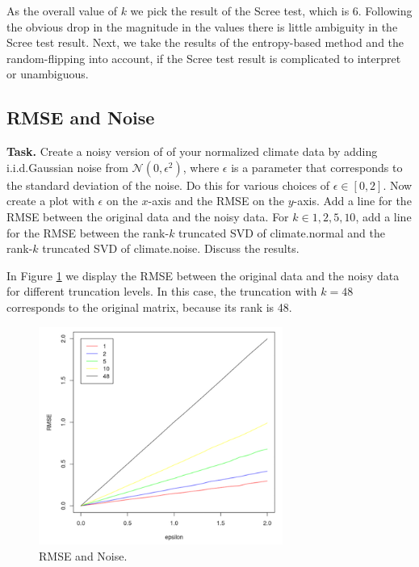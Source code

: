 \documentclass{support/acm_proc_article-sp}
\begin{document}
    As the overall value of $k$ we pick the result of the Scree test, which is 6.
    Following the obvious drop in the magnitude in the values there is little ambiguity in the Scree test result.
    Next, we take the results of the entropy-based method and the random-flipping into account, if the Scree test result
    is complicated to interpret or unambiguous.


    \subsection{RMSE and Noise}

    \textbf{Task.} Create a noisy version of of your normalized climate data by adding i.i.d.\@ Gaussian noise from
    $\mathcal{N}(0, \epsilon^2)$, where $\epsilon$ is a parameter that corresponds to the standard deviation of the noise.
    Do this for various choices of $\epsilon \in [0,2]$.
    Now create a plot with $\epsilon$ on the $x$-axis and the RMSE on the $y$-axis.
    Add a line for the RMSE between the original data and the noisy data.
    For $k \in {1,2,5,10}$, add a line for the RMSE between the rank-$k$ truncated SVD of climate.normal and the rank-$k$
    truncated SVD of climate.noise.
    Discuss the results.

    In Figure \ref{fig:rmse-noise} we display the RMSE between the original data and the noisy data for different truncation
    levels.
    In this case, the truncation with $k=48$ corresponds to the original matrix, because its rank is 48.
    \begin{figure}[!htbp]
        \centering
        \includegraphics[width=8cm]{images/rmse-noise.png}
        \caption{RMSE and Noise.}
        \label{fig:rmse-noise}
    \end{figure}
\end{document}
